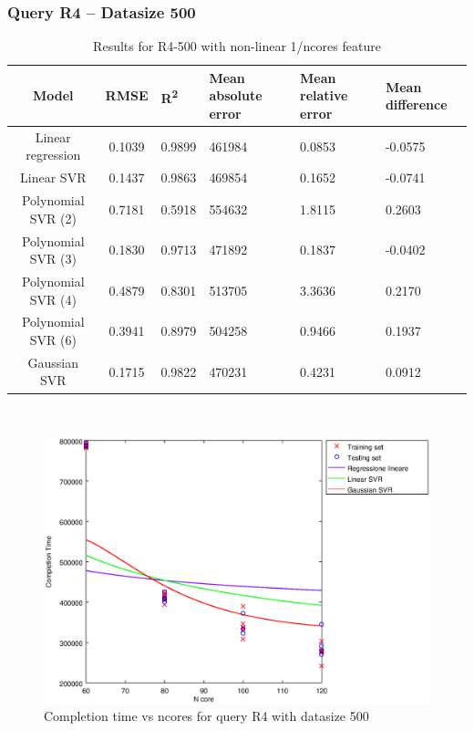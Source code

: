 \documentclass[a4paper,11pt]{article}
\begin{document}
\newpage
\subsubsection{Query R4 -- Datasize 500}
\begin{table}[H]
	\centering
	\begin{adjustbox}{center}
		\begin{tabular}{c | c M{1.2cm} M{2.5cm} M{2.5cm} M{1.8cm}}
			Model & RMSE & R\textsuperscript{2} & Mean absolute error & Mean relative error & Mean difference \tabularnewline
			\hline
			Linear regression & 0.1039 & 0.9899 & 461984 & 0.0853 & -0.0575 \\
			Linear SVR & 0.1437 & 0.9863 & 469854 & 0.1652 & -0.0741 \\
			Polynomial SVR (2) & 0.7181 & 0.5918 & 554632 & 1.8115 & 0.2603 \\
			Polynomial SVR (3) & 0.1830 & 0.9713 & 471892 & 0.1837 & -0.0402 \\
			Polynomial SVR (4) & 0.4879 & 0.8301 & 513705 & 3.3636 & 0.2170 \\
			Polynomial SVR (6) & 0.3941 & 0.8979 & 504258 & 0.9466 & 0.1937 \\
			Gaussian SVR & 0.1715 & 0.9822 & 470231 & 0.4231 & 0.0912 \\
		\end{tabular}
	\end{adjustbox}
	\\
	\caption{Results for R4-500 with non-linear 1/ncores feature}
	\label{table_R4_prediction_all}
\end{table}

\begin {figure}[hbtp]
\centering
\includegraphics[width=\textwidth]{output/R4_500_1_OVER_NCORES/plot_R4_500_bestmodels.eps}
\caption {Completion time vs ncores for query R4 with datasize 500}
\end {figure}
\end{document}
